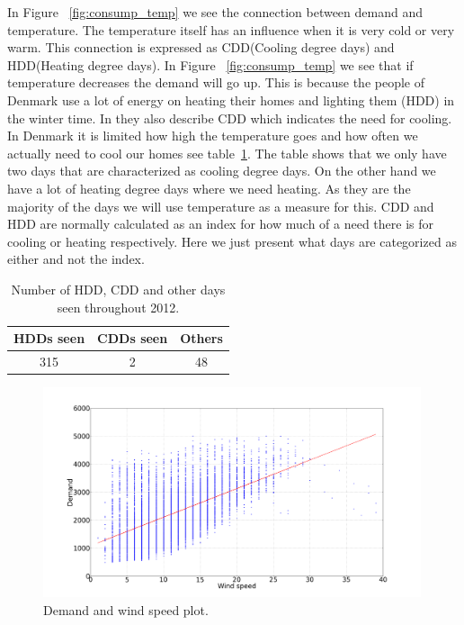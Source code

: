 In Figure ~\ref{fig:consump_temp} we see the connection between demand and temperature. The temperature itself has an influence when it is very cold or very warm. This connection is expressed as CDD(Cooling degree days) and HDD(Heating degree days). In Figure ~\ref{fig:consump_temp} we see that if temperature decreases the demand will go up. This is because the people of Denmark use a lot of energy on heating their homes and lighting them (HDD) in the winter time. In \cite{19} they also describe CDD which indicates the need for cooling. In Denmark it is limited how high the temperature goes and how often we actually need to cool our homes see table~\ref{table:CDD_HDD}. The table shows that we only have two days that are characterized as cooling degree days. On the other hand we have a lot of heating degree days where we need heating. As they are the majority of the days we will use temperature as a measure for this. CDD and HDD are normally calculated as an index for how much of a need there is for cooling or heating respectively. Here we just present what days are categorized as either and not the index.

\begin{table}[H]
\centering
\begin{tabular}{|c|c|c|} 
	\hline
HDDs seen & CDDs seen & Others \\ [0.5ex]
\hline
315 & 2 & 48 \\  \hline
\end{tabular}
\caption{Number of HDD, CDD and other days seen throughout 2012.} %
\label{table:CDD_HDD} %
\end{table}

\begin{figure}[H]
\centering
\includegraphics[width=0.99\textwidth ]{billeder/energy_price_plots/consump_wind.png}
\caption{Demand and wind speed plot.}
\label{fig:consump_wind}
\end{figure}


